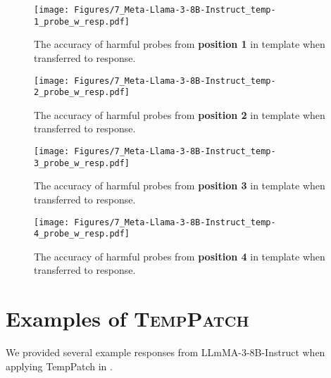 \begin{figure}[t]
  \centering
  \texttt{[image: Figures/7\_Meta-Llama-3-8B-Instruct\_temp-1\_probe\_w\_resp.pdf]}
  \caption{The accuracy of harmful probes from \textbf{position 1} in template when transferred to response.}
  \label{fig:probe_in_resp_temp1}
\end{figure}

\begin{figure}[t]
  \centering
  \texttt{[image: Figures/7\_Meta-Llama-3-8B-Instruct\_temp-2\_probe\_w\_resp.pdf]}
  \caption{The accuracy of harmful probes from \textbf{position 2} in template when transferred to response.}
  \label{fig:probe_in_resp_temp2}
\end{figure}

\begin{figure}[t]
  \centering
  \texttt{[image: Figures/7\_Meta-Llama-3-8B-Instruct\_temp-3\_probe\_w\_resp.pdf]}
  \caption{The accuracy of harmful probes from \textbf{position 3} in template when transferred to response.}
  \label{fig:probe_in_resp_temp3}
\end{figure}

\begin{figure}[t]
  \centering
  \texttt{[image: Figures/7\_Meta-Llama-3-8B-Instruct\_temp-4\_probe\_w\_resp.pdf]}
  \caption{The accuracy of harmful probes from \textbf{position 4} in template when transferred to response.}
  \label{fig:probe_in_resp_temp4}
\end{figure}


\section{Examples of \textsc{TempPatch}}

We provided several example responses from LLmMA-3-8B-Instruct when applying TempPatch in .


